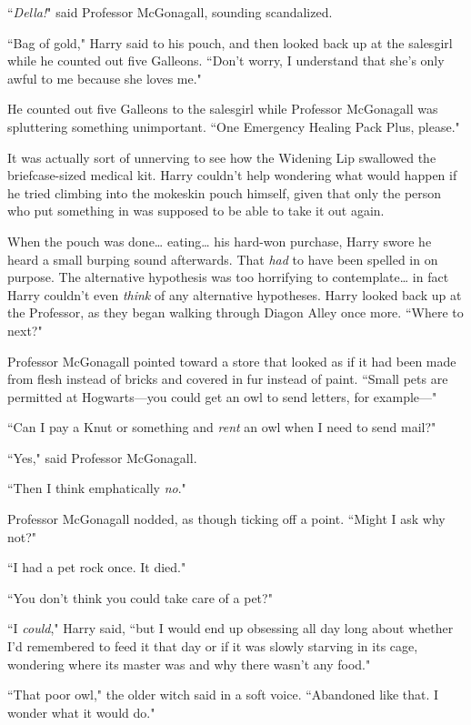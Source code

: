 ``\emph{Della!}" said Professor McGonagall, sounding scandalized.

``Bag of gold," Harry said to his pouch, and then looked back up at the salesgirl while he counted out five Galleons. ``Don't worry, I understand that she's only awful to me because she loves me."

He counted out five Galleons to the salesgirl while Professor McGonagall was spluttering something unimportant. ``One Emergency Healing Pack Plus, please."

It was actually sort of unnerving to see how the Widening Lip swallowed the briefcase-sized medical kit. Harry couldn't help wondering what would happen if he tried climbing into the mokeskin pouch himself, given that only the person who put something in was supposed to be able to take it out again.

When the pouch was done{\ldots} eating{\ldots} his hard-won purchase, Harry swore he heard a small burping sound afterwards. That \emph{had} to have been spelled in on purpose. The alternative hypothesis was too horrifying to contemplate{\ldots} in fact Harry couldn't even \emph{think} of any alternative hypotheses. Harry looked back up at the Professor, as they began walking through Diagon Alley once more. ``Where to next?"

Professor McGonagall pointed toward a store that looked as if it had been made from flesh instead of bricks and covered in fur instead of paint. ``Small pets are permitted at Hogwarts—you could get an owl to send letters, for example—"

``Can I pay a Knut or something and \emph{rent} an owl when I need to send mail?"

``Yes," said Professor McGonagall.

``Then I think emphatically \emph{no}."

Professor McGonagall nodded, as though ticking off a point. ``Might I ask why not?"

``I had a pet rock once. It died."

``You don't think you could take care of a pet?"

``I \emph{could}," Harry said, ``but I would end up obsessing all day long about whether I'd remembered to feed it that day or if it was slowly starving in its cage, wondering where its master was and why there wasn't any food."

``That poor owl," the older witch said in a soft voice. ``Abandoned like that. I wonder what it would do."

